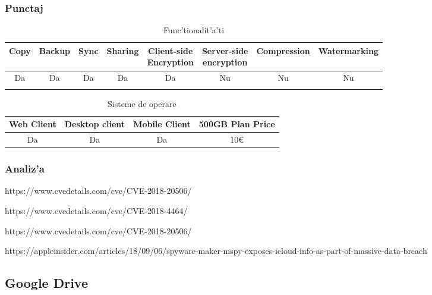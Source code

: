 \documentclass[12pt,a4paper,twoside]{report}
\newcommand{\greencheck}{\color{green}  \ding{51}}
\newcommand{\redxmark}{\color{red} \ding{55}}
\begin{document}
\subsubsection{Punctaj}
\begin{table}[H]
\centering
\caption{Func'tionalit'a'ti}
\begin{tabular}{|c|c|c|c|c|c|c|c|}          
\hline               
Copy & Backup & Sync & Sharing & \makecell{Client-side\\ Encryption} & \makecell{Server-side \\ encryption} & Compression & Watermarking \\ [0.5ex]   
\hline 
Da & Da & Da & Da & Da & Nu & Nu & Nu    \\                      
\greencheck & \greencheck & \greencheck\greencheck & \greencheck & \greencheck\greencheck & \redxmark\redxmark &  \redxmark\redxmark &  \redxmark\redxmark  \\               
\hline                              
\end{tabular}
\label{table:icloudfeaturetable}             
\end{table}
\begin{table}[H]
\centering
\caption{Sisteme de operare}
\begin{tabular}{|c|c|c|c|}          
\hline                      
 Web Client & Desktop client & Mobile Client & 500GB Plan Price\\ [0.5ex]   
\hline                            
Da & Da & Da & 10\euro \\               
\hline                              
\end{tabular}
\label{table:icloudsystemtable}             
\end{table}
\subsubsection{Analiz'a}
https://www.cvedetails.com/cve/CVE-2018-20506/ 

https://www.cvedetails.com/cve/CVE-2018-4464/

https://www.cvedetails.com/cve/CVE-2018-20506/

https://appleinsider.com/articles/18/09/06/spyware-maker-mspy-exposes-icloud-info-as-part-of-massive-data-breach
\subsection{Google Drive}
\end{document}

